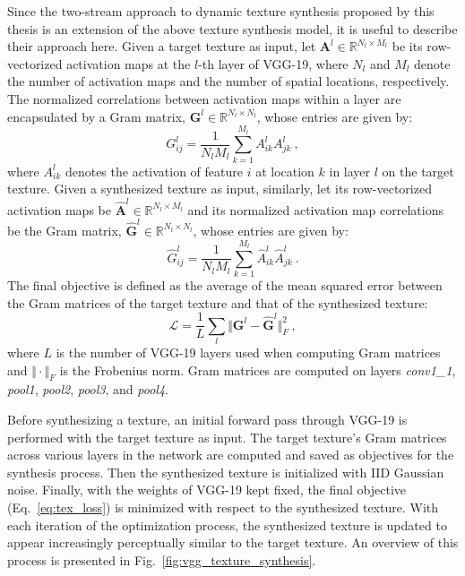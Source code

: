 Since the two-stream approach to dynamic texture synthesis proposed by this thesis is an extension of the above texture 
synthesis model, it is useful to describe their approach here. Given a target texture as input,
let $\mathbf{A}^{l} \in \mathbb{R}^{N_l\times M_l}$
be its row-vectorized activation maps at the $l$-th layer of VGG-19, where $N_l$ and $M_l$ denote the number of
activation maps and the number of spatial locations,
respectively. The normalized correlations between activation maps
within a layer are encapsulated by a Gram matrix,
$\mathbf{G}^l \in \mathbb{R}^{N_l \times N_l}$, whose entries are given by:
\begin{equation}
	G_{ij}^l = \frac{1}{N_l M_l} \sum_{k=1}^{M_l} A_{ik}^l A_{jk}^l\ ,
\end{equation}
where $A_{ik}^l$ denotes the activation of feature $i$ at
location $k$ in layer $l$ on the target texture.
Given a synthesized texture as input, similarly, let its row-vectorized activation maps
be $\hat{\mathbf{A}}^{l} \in \mathbb{R}^{N_l\times M_l}$ and its normalized
activation map correlations be the Gram matrix, $\hat{\mathbf{G}}^l \in \mathbb{R}^{N_l \times N_l}$, whose entries are given by:
\begin{equation}
	\hat{G}_{ij}^l = \frac{1}{N_l M_l} \sum_{k=1}^{M_l} \hat{A}_{ik}^l \hat{A}_{jk}^l\ .
\end{equation}
The final objective is defined as the average of the mean squared error between
the Gram matrices of the target texture and that of the synthesized texture:
\begin{equation}
   \mathcal{L} = \frac{1}{L} \sum_{l} \Vert \mathbf{G}^l - \hat{\mathbf{G}}^l \Vert^2_F\ ,
   \label{eq:tex_loss}
\end{equation}
where $L$ is the number of VGG-19 layers used when computing Gram matrices
and $\Vert \cdot \Vert_F$ is the Frobenius norm. Gram matrices are computed on
layers \emph{conv1\_1}, \emph{pool1}, \emph{pool2}, \emph{pool3}, and \emph{pool4}.

Before synthesizing a texture, an initial forward pass through VGG-19 is
performed with the target texture as input. The target texture's Gram matrices
across various layers in the network are computed and saved as objectives for
the synthesis process. Then the synthesized texture is initialized with IID
Gaussian noise. Finally, with the weights of VGG-19 kept fixed, the final
objective (Eq.\ \ref{eq:tex_loss}) is minimized with respect to the synthesized texture. With each
iteration of the optimization process, the synthesized texture is updated to appear increasingly
perceptually similar to the target texture. An overview of this process is presented in Fig.\ \ref{fig:vgg_texture_synthesis}.
\clearpage

\clearpage

